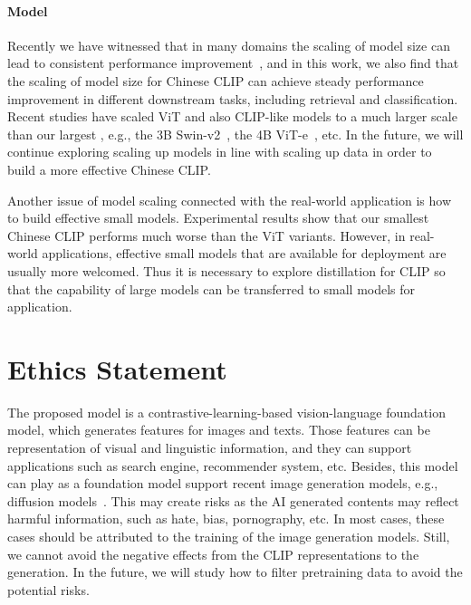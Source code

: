 \documentclass[11pt]{article}
\begin{document}
\paragraph{Model} 
Recently we have witnessed that in many domains the scaling of model size can lead to consistent performance improvement~\citep{scaling_laws,emergent}, and in this work, we also find that the scaling of model size for Chinese CLIP can achieve steady performance improvement in different downstream tasks, including retrieval and classification. 
Recent studies have scaled ViT and also CLIP-like models to a much larger scale than our largest , e.g., the 3B Swin-v2~\citep{swin-v2}, the 4B ViT-e~\citep{pali}, etc. 
In the future, we will continue exploring scaling up models in line with scaling up data in order to build a more effective Chinese CLIP. 

Another issue of model scaling connected with the real-world application is how to build effective small models. 
Experimental results show that our smallest Chinese CLIP  performs much worse than the ViT variants. 
However, in real-world applications, effective small models that are available for deployment are usually more welcomed. 
Thus it is necessary to explore distillation for CLIP so that the capability of large models can be transferred to small models for application. 






\section*{Ethics Statement}
The proposed model is a contrastive-learning-based vision-language foundation model, which generates features for images and texts. Those features can be representation of visual and linguistic information, and they can support applications such as search engine, recommender system, etc. 
Besides, this model can play as a foundation model support recent image generation models, e.g., diffusion models~\citep{dalle2}. 
This may create risks as the AI generated contents may reflect harmful information, such as hate, bias, pornography, etc. 
In most cases, these cases should be attributed to the training of the image generation models. 
Still, we cannot avoid the negative effects from the CLIP representations to the generation. 
In the future, we will study how to filter pretraining data to avoid the potential risks. 
\end{document}
